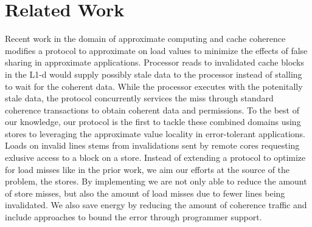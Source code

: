 \section{Related Work}

Recent work \cite{Rengasamy2015} in the domain of approximate computing and cache coherence modifies a protocol to approximate on load values to minimize the effects of false sharing in approximate applications. Processor reads to invalidated cache blocks in the L1-d would supply possibly stale data to the processor instead of stalling to wait for the coherent data. While the processor executes with the potenitally stale data, the protocol concurrently services the miss through standard coherence transactions to obtain coherent data and permissions. To the best of our knowledge, our protocol is the first to tackle these combined domains using stores to leveraging the approximate value locality in error-tolerant applications. Loads on invalid lines stems from invalidations sent by remote cores requesting exlusive access to a block on a store. Instead of extending a protocol to optimize for load misses like in the prior work, we aim our efforts at the source of the problem, the stores. By implementing \storea we are not only able to reduce the amount of store misses, but also the amount of load misses due to fewer lines being invalidated. We also save energy by reducing the amount of coherence traffic and include approaches to bound the error through programmer support.  